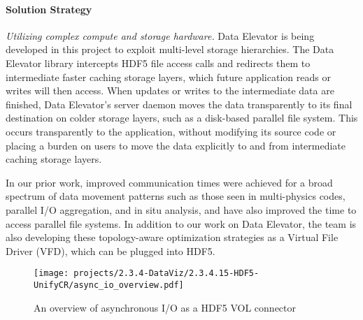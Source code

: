 \paragraph{Solution Strategy}

\textit{Utilizing complex compute and storage hardware. } Data Elevator is being developed in this project to exploit multi-level storage hierarchies. The Data Elevator library intercepts HDF5 file access calls and redirects them to intermediate faster caching storage layers, which future application reads or writes will then access. When updates or writes to the intermediate data are finished, Data Elevator's server daemon moves the data transparently to its final destination on colder storage layers, such as a disk-based parallel file system.  This occurs transparently to the application, without modifying its source code or placing a burden on users to move the data explicitly to and from  intermediate caching storage layers.

In our prior work, improved communication times were achieved for a broad spectrum of data movement patterns such as those seen in multi-physics codes, parallel I/O aggregation, and in situ analysis, and have also improved the time to access parallel file systems. In addition to our work on Data Elevator, the team is also developing these topology-aware optimization strategies as a Virtual File Driver (VFD), which can be plugged into HDF5.  

\begin{wrapfigure}{r}{0.51\textwidth}
  \begin{center}
    \texttt{[image: projects/2.3.4-DataViz/2.3.4.15-HDF5-UnifyCR/async\_io\_overview.pdf]}
  \end{center}
  \caption{An overview of asynchronous I/O as a HDF5 VOL connector}
  \label{fig:asyncio-overview}
\end{wrapfigure}

